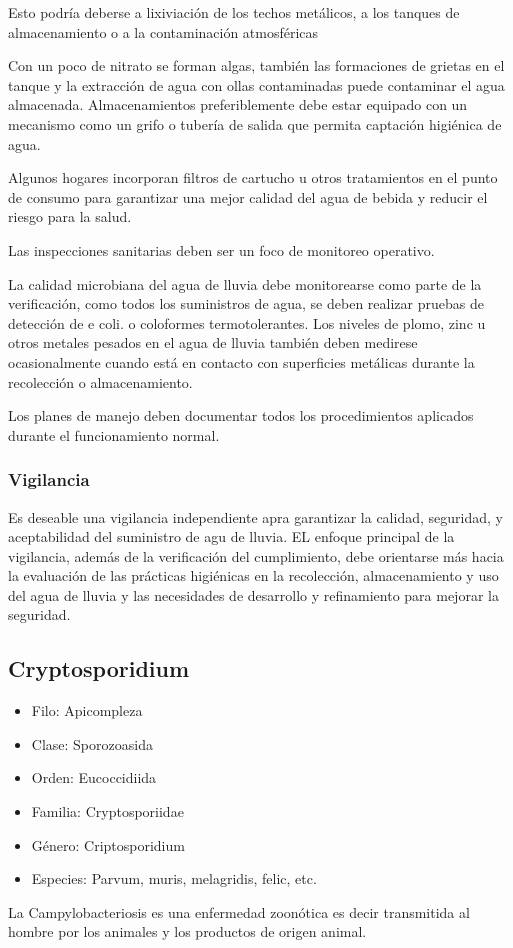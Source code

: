 Esto podría deberse a lixiviación de los techos metálicos, a los tanques de almacenamiento o a la contaminación atmosféricas

Con un poco de nitrato se forman algas, también las formaciones de grietas en el tanque y la extracción de agua con ollas contaminadas puede contaminar el agua almacenada. Almacenamientos preferiblemente debe estar equipado con un mecanismo como un grifo o tubería de salida que permita captación higiénica de agua.

Algunos hogares incorporan filtros de cartucho u otros tratamientos en el punto de consumo para garantizar una mejor calidad del agua de bebida y reducir el riesgo para la salud.

Las inspecciones sanitarias deben ser un foco de monitoreo operativo. 

La calidad microbiana del agua de lluvia debe monitorearse como parte de la verificación, como todos los suministros de agua, se deben realizar pruebas de detección de e coli. o coloformes termotolerantes. Los niveles de plomo, zinc u otros metales pesados en el agua de lluvia también deben medirese ocasionalmente cuando está en contacto con superficies metálicas durante la recolección o almacenamiento.

Los planes de manejo deben documentar todos los procedimientos aplicados durante el funcionamiento normal.

\subsubsection{Vigilancia}
Es deseable una vigilancia independiente apra garantizar la calidad, seguridad, y aceptabilidad del suministro de agu de lluvia. EL enfoque principal de la vigilancia, además de la verificación del cumplimiento, debe orientarse más hacia la evaluación de las prácticas higiénicas en la recolección, almacenamiento y uso del agua de lluvia y las necesidades de desarrollo y refinamiento para mejorar la seguridad.
\subsection{Cryptosporidium}
\begin{itemize}
    \item Filo: Apicompleza
    \item Clase: Sporozoasida
    \item Orden: Eucoccidiida
    \item Familia: Cryptosporiidae
    \item Género: Criptosporidium
    \item Especies: Parvum, muris, melagridis, felic, etc.
\end{itemize}
La Campylobacteriosis es una enfermedad zoonótica es decir transmitida al hombre por los animales y los productos de origen animal.

